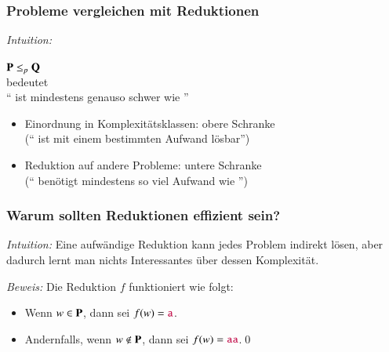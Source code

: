 \documentclass[aspectratio=1610,onlymath]{beamer}
\begin{document}
\begin{frame}\frametitle{Probleme vergleichen mit Reduktionen}

\emph{Intuition:}
\begin{center}
{\large$\textbf{\textcolor{black}{P}}\leq_p \textbf{\textcolor{black}{Q}}$}\\[1ex]
bedeutet\\[1ex]
{\large"` ist mindestens genauso schwer wie "'}
\end{center}

\bigskip
\begin{itemize}
\item Einordnung in Komplexitätsklassen: \alert{obere Schranke}\\ ("` ist mit einem bestimmten Aufwand lösbar"')
\item Reduktion auf andere Probleme: \alert{untere Schranke}\\ ("` benötigt mindestens so viel Aufwand wie "')
\end{itemize}

\end{frame}

\begin{frame}\frametitle{Warum sollten Reduktionen effizient sein?}

\emph{Intuition:} Eine aufwändige Reduktion kann jedes Problem indirekt lösen, aber dadurch lernt man nichts
Interessantes über dessen Komplexität.\pause
\bigskip

\pause

\emph{Beweis:} Die Reduktion $f$ funktioniert wie folgt:
\begin{itemize}
\item Wenn $w\in \textbf{\textcolor{black}{P}}$, dann sei $f(w)=\mathtt{\textcolor{purple}{a}}$.
\item Andernfalls, wenn $w\notin \textbf{\textcolor{black}{P}}$, dann sei $f(w)=\mathtt{\textcolor{purple}{aa}}$.\qed
\end{itemize}

\end{frame}




\end{document}
